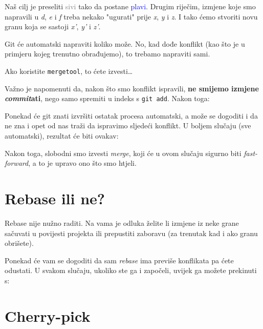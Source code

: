 

Naš cilj je preseliti \textcolor{gray}{sivi} tako da postane \textcolor{blue}{plavi}.
Drugim riječim, izmjene koje smo napravili u \emph d, \emph e i \emph f treba nekako "ugurati" prije \emph x, \emph y i \emph z.
I tako ćemo stvoriti novu granu koja se sastoji \emph{x'}, \emph{y'} i \emph{z'}.

Git će automatski napraviti koliko može.
No, kad dođe konflikt (kao što je u primjeru kojeg trenutno obrađujemo), to trebamo napraviti sami.

Ako koristite \verb+mergetool+, to ćete izvesti\dots



Važno je napomenuti da, nakon što smo konflikt ispravili, \textbf{ne smijemo izmjene \emph{commit}ati}, nego samo spremiti u indeks s \verb+git add+.
Nakon toga:


Ponekad će git znati izvršiti ostatak procesa automatski, a može se dogoditi i da ne zna i opet od nas traži da ispravimo sljedeći konflikt.
U boljem slučaju (sve automatski), rezultat će biti ovakav:



Nakon toga, slobodni smo izvesti \emph{merge}, koji će u ovom slučaju sigurno biti \emph{fast-forward}, a to je upravo ono što smo htjeli.

\section*{Rebase ili ne?}

Rebase nije nužno raditi.
Na vama je odluka želite li izmjene iz neke grane sačuvati u povijesti projekta ili prepustiti zaboravu (za trenutak kad i ako granu obrišete).

Ponekad će vam se dogoditi da sam \emph{rebase} ima previše konflikata pa ćete odustati.
U svakom slučaju, ukoliko ste ga i započeli, uvijek ga možete prekinuti s:


\section*{Cherry-pick}

